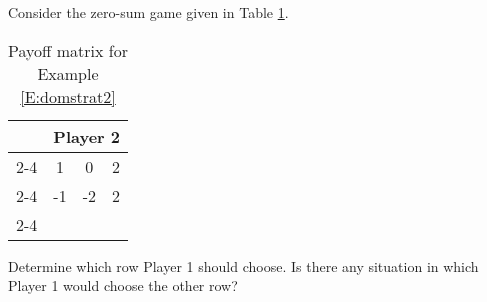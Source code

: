 \begin{example}\label{E:domstrat2} Consider the zero-sum game given in Table \ref{T:biggerexampleP1}.



\begin{table}[h]
\centering

\begin{tabular}{cccc}
                      & \multicolumn{3}{c}{Player 2}                                                  \\ \cline{2-4} 
\multicolumn{1}{l|}{Player 1} & \multicolumn{1}{c|}{1} & \multicolumn{1}{c|}{0} & \multicolumn{1}{c|}{2} \\ \cline{2-4} 
\multicolumn{1}{l|}{} & \multicolumn{1}{c|}{-1} & \multicolumn{1}{c|}{-2} & \multicolumn{1}{c|}{2} \\ \cline{2-4} 
\end{tabular}
\caption{Payoff matrix for Example \ref{E:domstrat2}}
\label{T:biggerexampleP1}
\end{table}


Determine which row Player 1 should choose. Is there any situation in which Player 1 would choose the other row? 
\end{example}



